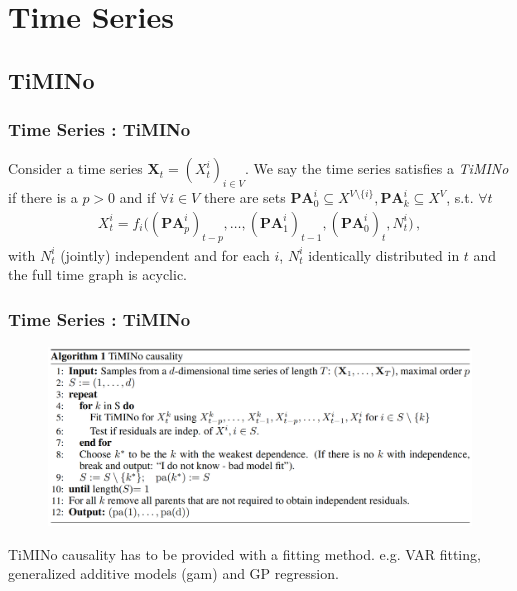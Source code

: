 \documentclass{beamer}
\newcommand{\B}[1]{\mathbf{#1}}
\newcommand{\X}{{\mathbf X}}
\newcommand{\eps}{{N}}
\newcommand{\PA}[2][]{{\B{PA}}^{#1}_{#2}}
\begin{document}
\section{Time Series}
\subsection{TiMINo}
\begin{frame}
\frametitle{Time Series : TiMINo}
\begin{definition} \label{def:timino}
	Consider a time series $\X_t=(X^i_t)_{i \in V}$. We say the time series satisfies a \emph{TiMINo} if there is a $p>0$ and if $\forall i \in V$ there are sets $\PA[i]{0} \subseteq X^{V\setminus\{i\}}, \PA[i]{k} \subseteq X^V$, s.t. $\forall t$
	\begin{align} \label{anm}
	X^i_t = f_{i}\big((\PA[i]{p})_{t-p}, \ldots, (\PA[i]{1})_{t-1}, (\PA[i]{0})_{t}, \eps^i_t\big)\,,
	\end{align}
	with  
	$\eps^i_t$ (jointly) independent and for each $i$, $\eps^i_t$ identically distributed in $t$ and the full time graph is acyclic.
\end{definition}
\cite{time}
\end{frame}

\begin{frame}[fragile]
	\frametitle{Time Series : TiMINo}
\begin{figure}
	\includegraphics[scale=0.2]{timinoalg.png}
\end{figure}
TiMINo causality has to be provided with a fitting method.
e.g. VAR fitting,  generalized additive models (gam) and  GP regression. 
\end{frame}
\end{document}

